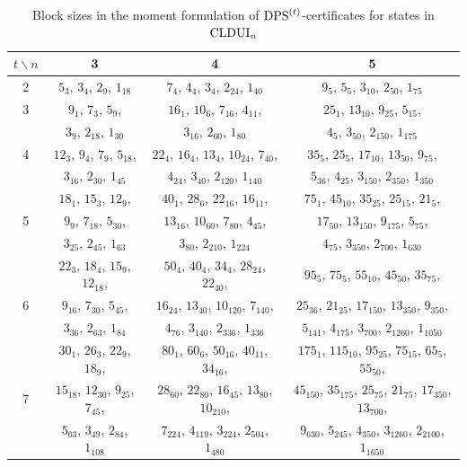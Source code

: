 \documentclass[11pt]{article}
\newcommand{\CLDUI}{\text{\rm CLDUI}}
\newcommand{\DPS}{\text{\rm DPS}}
\theoremstyle{plain}
\begin{document}
\begin{table}[h!]
    \centering
    \begin{tabular}{c|c|c|c}
         $t\backslash n$ & 3 & 4 & 5 \\ \hline
         2 & $5_3$, $3_4$, $2_9$, $1_{18}$ & $7_4$, $4_4$, $3_4$, $2_{24}$, $1_{40}$ & $9_5$, $5_5$, $3_{10}$, $2_{50}$, $1_{75}$ \\ \hline
         3 & $9_1$, $7_3$, $5_9$, & $16_1$, $10_6$, $7_{16}$, $4_{11}$, & $25_1$, $13_{10}$, $9_{25}$, $5_{15}$, \\
         & $3_9$, $2_{18}$, $1_{30}$ & $3_{16}$, $2_{60}$, $1_{80}$ & $4_5$, $3_{50}$, $2_{150}$, $1_{175}$ \\\hline
         4 & $12_3$, $9_4$, $7_9$, $5_{18}$, & $22_4$, $16_4$, $13_4$, $10_{24}$, $7_{40}$, & $35_5$, $25_5$, $17_{10}$, $13_{50}$, $9_{75}$, \\
          &  $3_{16}$, $2_{30}$, $1_{45}$ &  $4_{24}$, $3_{40}$, $2_{120}$, $1_{140}$ &  $5_{36}$, $4_{25}$, $3_{150}$, $2_{350}$, $1_{350}$\\ \hline
          & $18_1$, $15_3$, $12_9$, & $40_1$, $28_6$, $22_{16}$, $16_{11}$, & $75_1$, $45_{10}$, $35_{25}$, $25_{15}$, $21_{5}$, \\
          5 & $9_9$, $7_{18}$, $5_{30}$, &  $13_{16}$, $10_{60}$, $7_{80}$, $4_{45}$, & $17_{50}$, $13_{150}$, $9_{175}$, $5_{75}$, \\
           & $3_{25}$, $2_{45}$, $1_{63}$ & $3_{80}$, $2_{210}$, $1_{224}$ & $4_{75}$, $3_{350}$, $2_{700}$, $1_{630}$\\\hline
         & $22_3$, $18_4$, $15_9$, $12_{18}$, & $50_4$, $40_4$, $34_4$, $28_{24}$, $22_{40}$, & $95_5$, $75_5$, $55_{10}$, $45_{50}$, $35_{75}$, \\
         6  & $9_{16}$, $7_{30}$, $5_{45}$, & $16_{24}$, $13_{40}$, $10_{120}$, $7_{140}$, & $25_{36}$, $21_{25}$, $17_{150}$, $13_{350}$, $9_{350}$, \\
           & $3_{36}$, $2_{63}$, $1_{84}$ & $4_{76}$, $3_{140}$, $2_{336}$, $1_{336}$ & $5_{141}$, $4_{175}$, $3_{700}$, $2_{1260}$, $1_{1050}$\\\hline
          & $30_1$, $26_3$, $22_9$, $18_9$, & $80_1$, $60_6$, $50_{16}$, $40_{11}$, $34_{16}$, & $175_1$, $115_{10}$, $95_{25}$, $75_{15}$, $65_5$, $55_{50}$, \\
         7& $15_{18}$, $12_{30}$, $9_{25}$, $7_{45}$, & $28_{60}$, $22_{80}$, $16_{45}$, $13_{80}$, $10_{210}$, & $45_{150}$, $35_{175}$, $25_{75}$, $21_{75}$, $17_{350}$, $13_{700}$, \\
          & $5_{63}$, $3_{49}$, $2_{84}$, $1_{108}$ & $7_{224}$, $4_{119}$, $3_{224}$, $2_{504}$, $1_{480}$ & $9_{630}$, $5_{245}$, $4_{350}$, $3_{1260}$, $2_{2100}$, $1_{1650}$
    \end{tabular}
    \caption{Block sizes in the moment formulation of $\DPS^{(t)}$-certificates for states in $\CLDUI_n$}
    \label{tab:CLDUIBlockSize}
\end{table}
\end{document}
